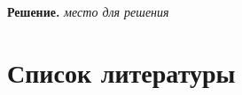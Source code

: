 \documentclass[dvipsnames]{article}
\begin{document}
\begin{enumerate}
  \color{blue}
  \textbf{Решение.}
  \emph{место для решения}
  \color{black}

\end{enumerate}

\section*{Список литературы}
\printbibliography[heading=none]
\end{document}
